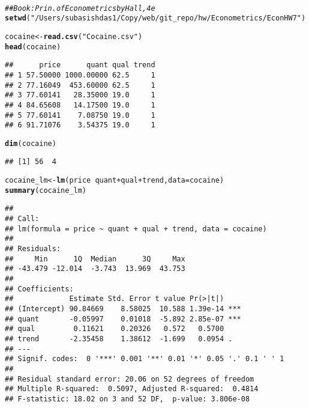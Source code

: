 \documentclass[a4paper]{article}\usepackage[]{graphicx}\usepackage[]{color}
\makeatletter
\newcommand{\hlstr}[1]{\textcolor[rgb]{0.192,0.494,0.8}{#1}}%
\newcommand{\hlcom}[1]{\textcolor[rgb]{0.678,0.584,0.686}{\textit{#1}}}%
\newcommand{\hlopt}[1]{\textcolor[rgb]{0,0,0}{#1}}%
\newcommand{\hlstd}[1]{\textcolor[rgb]{0.345,0.345,0.345}{#1}}%
\newcommand{\hlkwb}[1]{\textcolor[rgb]{0.69,0.353,0.396}{#1}}%
\newcommand{\hlkwc}[1]{\textcolor[rgb]{0.333,0.667,0.333}{#1}}%
\newcommand{\hlkwd}[1]{\textcolor[rgb]{0.737,0.353,0.396}{\textbf{#1}}}%
\newenvironment{kframe}{%
 \def\at@end@of@kframe{}%
 \ifinner\ifhmode%
  \def\at@end@of@kframe{\end{minipage}}%
  \begin{minipage}{\columnwidth}%
 \fi\fi%
 \def\FrameCommand##1{\hskip\@totalleftmargin \hskip-\fboxsep
 \colorbox{shadecolor}{##1}\hskip-\fboxsep
     \hskip-\linewidth \hskip-\@totalleftmargin \hskip\columnwidth}%
 \MakeFramed {\advance\hsize-\width
   \@totalleftmargin\z@ \linewidth\hsize
   \@setminipage}}%
 {\par\unskip\endMakeFramed%
 \at@end@of@kframe}
\newenvironment{knitrout}{}{} %
\makeatother
\begin{document}
\\
\begin{knitrout}
\color{fgcolor}\begin{kframe}
\begin{alltt}
\hlcom{## Book: Prin. of Econometrics by Hall, 4 e}
\hlkwd{setwd}\hlstd{(}\hlstr{"/Users/subasishdas1/Copy/web/git_repo/hw/Econometrics/Econ HW 7"}\hlstd{)}
\end{alltt}


{\ttfamily\noindent\bfseries{}}\begin{alltt}
\hlstd{cocaine} \hlkwb{<-} \hlkwd{read.csv}\hlstd{(}\hlstr{"Cocaine.csv"}\hlstd{)}
\hlkwd{head}\hlstd{(cocaine)}
\end{alltt}
\begin{verbatim}
##      price      quant qual trend
## 1 57.50000 1000.00000 62.5     1
## 2 77.16049  453.60000 62.5     1
## 3 77.60141   28.35000 19.0     1
## 4 84.65608   14.17500 19.0     1
## 5 77.60141    7.08750 19.0     1
## 6 91.71076    3.54375 19.0     1
\end{verbatim}
\begin{alltt}
\hlkwd{dim}\hlstd{(cocaine)}
\end{alltt}
\begin{verbatim}
## [1] 56  4
\end{verbatim}
\begin{alltt}
\hlstd{cocaine_lm} \hlkwb{<-} \hlkwd{lm}\hlstd{(price}\hlopt{~} \hlstd{quant}\hlopt{+}\hlstd{qual}\hlopt{+}\hlstd{trend,} \hlkwc{data}\hlstd{= cocaine)}
\hlkwd{summary}\hlstd{(cocaine_lm)}
\end{alltt}
\begin{verbatim}
## 
## Call:
## lm(formula = price ~ quant + qual + trend, data = cocaine)
## 
## Residuals:
##     Min      1Q  Median      3Q     Max 
## -43.479 -12.014  -3.743  13.969  43.753 
## 
## Coefficients:
##             Estimate Std. Error t value Pr(>|t|)    
## (Intercept) 90.84669    8.58025  10.588 1.39e-14 ***
## quant       -0.05997    0.01018  -5.892 2.85e-07 ***
## qual         0.11621    0.20326   0.572   0.5700    
## trend       -2.35458    1.38612  -1.699   0.0954 .  
## ---
## Signif. codes:  0 '***' 0.001 '**' 0.01 '*' 0.05 '.' 0.1 ' ' 1
## 
## Residual standard error: 20.06 on 52 degrees of freedom
## Multiple R-squared:  0.5097,	Adjusted R-squared:  0.4814 
## F-statistic: 18.02 on 3 and 52 DF,  p-value: 3.806e-08
\end{verbatim}
\end{kframe}
\end{knitrout}
\end{document}
